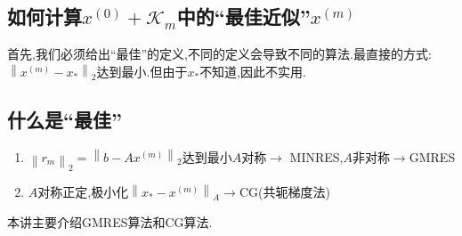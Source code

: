 \documentclass[12pt,a4paper]{article}
\begin{document}
\subsection*{如何计算$x^{(0)}+\mathcal{K}_{m}$中的“最佳近似”$x^{(m)}$}
首先,我们必须给出“最佳”的定义,不同的定义会导致不同的算法.最直接的方式:$\left\|x^{(m)}-x_{*}\right\|_{2}$达到最小.但由于$x_{*}$不知道,因此不实用.\\
\subsection*{\color{blue}什么是“最佳”}
\begin{enumerate}[(1)]
	\item $\left\|r_{m}\right\|_{2}=\left\|b-A x^{(m)}\right\|_{2}$达到最小$A$对称$\to$ {\color{blue}MINRES},$A$非对称$\to${\color{blue}GMRES}
	\item $A$对称正定,极小化$\left\|x_{*}-x^{(m)}\right\|_{A} \rightarrow \mathrm{CG}$(共轭梯度法)
\end{enumerate}
本讲主要介绍{\color{blue}GMRES}算法和{\color{blue}CG}算法.\\
\end{document}
